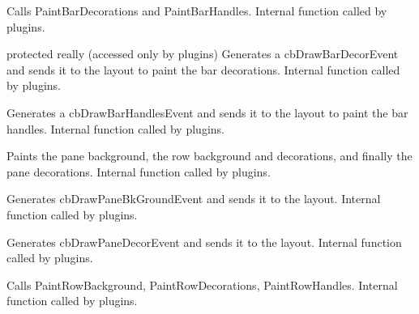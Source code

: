 
Calls PaintBarDecorations and PaintBarHandles.
Internal function called by plugins.


\label{cbdockpanepaintbardecorations}


protected really (accessed only by plugins) Generates a cbDrawBarDecorEvent and sends it to the layout to paint the bar decorations.
Internal function called by plugins.


\label{cbdockpanepaintbarhandles}


Generates a cbDrawBarHandlesEvent and sends it to the layout to paint the bar handles.
Internal function called by plugins.


\label{cbdockpanepaintpane}


Paints the pane background, the row background and decorations,
and finally the pane decorations.
Internal function called by plugins.


\label{cbdockpanepaintpanebackground}


Generates cbDrawPaneBkGroundEvent and sends it to the layout.
Internal function called by plugins.


\label{cbdockpanepaintpanedecorations}


Generates cbDrawPaneDecorEvent and sends it to the layout.
Internal function called by plugins.


\label{cbdockpanepaintrow}


Calls PaintRowBackground, PaintRowDecorations, PaintRowHandles.
Internal function called by plugins.


\label{cbdockpanepaintrowbackground}

